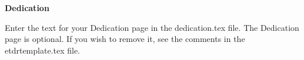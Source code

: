 
\newpage
\vspace*{0.9cm}
\begin{center}
{\bf \Huge Dedication}
\end{center}

\setlength{\baselineskip}{0.8cm}



Enter the text for your Dedication page in the dedication.tex file.
The Dedication page is optional.  If you wish to remove it, see the
comments in the etdrtemplate.tex file.
